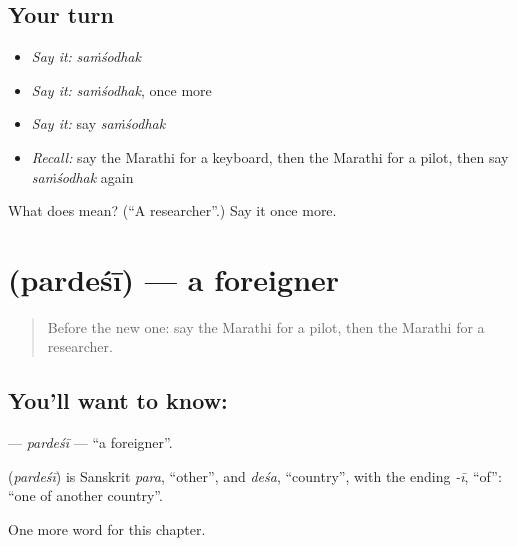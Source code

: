 \subsection*{Your turn}
\begin{itemize}
\raggedright
  \item \emph{Say it:} \emph{saṁśodhak}
  \item \emph{Say it:} \emph{saṁśodhak}, once more
  \item \emph{Say it:} say \emph{saṁśodhak}
  \item \emph{Recall:} say the Marathi for a keyboard, then the Marathi for a pilot, then say \emph{saṁśodhak} again
\end{itemize}

\begin{tcolorbox}[breakable,colback=teal!4,colframe=teal!35!black,title={Before you move on}]
What does  mean? (\textquotedblleft{}A researcher\textquotedblright{}.) Say it once more.
\end{tcolorbox}
\section[\texorpdfstring{\mr{परदेशी} (pardeśī)}{परदेशी (pardeśī)}]{ (pardeśī) — a foreigner}

\label{lesson:MR-C238-pardesi}



\begin{quote}
Before the new one: say the Marathi for a pilot, then the Marathi for a researcher.
\end{quote}

\subsection*{You'll want to know: }
\textbf{} — \emph{pardeśī} — \textquotedblleft{}a foreigner\textquotedblright{}.

\begin{cousinweb}
\textbf{} (\emph{pardeśī}) is Sanskrit \emph{para}, \textquotedblleft{}other\textquotedblright{}, and \emph{deśa}, \textquotedblleft{}country\textquotedblright{}, with the ending \emph{-ī}, \textquotedblleft{}of\textquotedblright{}: \textquotedblleft{}one of another country\textquotedblright{}.
\end{cousinweb}

\begin{grammarlens}[title={What you've built}]
One more word for this chapter.
\end{grammarlens}

